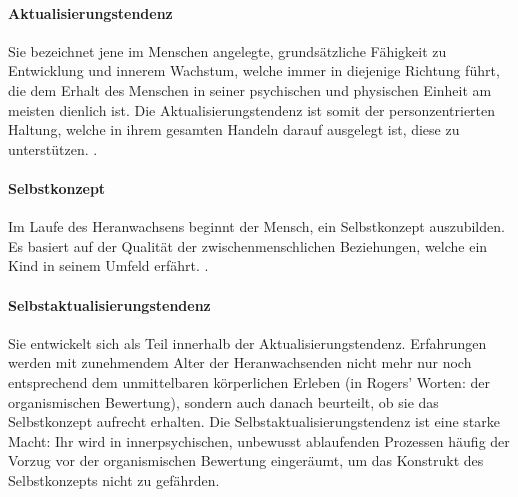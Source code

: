 \documentclass[
  twoside,
  parskip=half-,
  paper=176mm:246mm,
  BCOR=14mm,
  DIV=14,
]{scrreprt}
\begin{document}
\paragraph{Aktualisierungstendenz} Sie bezeichnet jene im Menschen angelegte, grundsätzliche Fähigkeit zu Entwicklung und innerem Wachstum, welche immer in diejenige Richtung führt, die dem Erhalt des Menschen in seiner psychischen und physischen Einheit am meisten dienlich ist. Die Aktualisierungstendenz ist somit  der personzentrierten Haltung, welche in ihrem gesamten Handeln darauf ausgelegt ist, diese   zu unterstützen. .

\paragraph{Selbstkonzept} Im Laufe des Heranwachsens beginnt der Mensch, ein Selbstkonzept auszubilden. Es basiert auf der Qualität der zwischenmenschlichen Beziehungen, welche ein Kind in seinem Umfeld erfährt. . 

\paragraph{Selbstaktualisierungstendenz} Sie entwickelt sich als Teil innerhalb der Aktualisierungstendenz. Erfahrungen werden mit zunehmendem Alter der Heranwachsenden nicht mehr nur noch entsprechend dem unmittelbaren körperlichen Erleben (in Rogers' Worten: der organismischen Bewertung), sondern auch danach beurteilt, ob sie das Selbstkonzept aufrecht erhalten. Die Selbstaktualisierungstendenz ist eine starke Macht: Ihr wird in innerpsychischen, unbewusst ablaufenden Prozessen häufig der Vorzug vor der organismischen Bewertung eingeräumt, um das Konstrukt des Selbstkonzepts nicht zu gefährden. 
\end{document}
